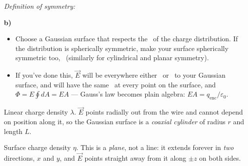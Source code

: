 \documentclass[12pt]{article}
\begin{document}
\textit{Definition of symmetry:}
\par\vspace{3.2cm}

\textbf{b)}
\begin{itemize}[itemsep=9pt,parsep=4pt,topsep=4pt]
\item Choose a Gaussian surface that respects the \bl[4.0cm]\ of the charge
distribution. If the distribution is spherically symmetric, make your surface
spherically symmetric too, \bl[6.4cm]\ (similarly for cylindrical and planar symmetry).
\item If you've done this, $\vec E$ will be everywhere either \bl[4.4cm]\ or
\bl[4.4cm]\ to your Gaussian surface, and will have the same \bl[3.2cm]\ at every
point on the surface, and $\Phi=E\oint dA=EA$ --- Gauss's law becomes
plain algebra: $EA=q_{\text{enc}}/\varepsilon_0$.
\end{itemize}



\vspace*{\fill}
\newpage


Linear charge density $\lambda$. $\vec{E}$ points radially out from the wire and cannot
depend on position along it, so the Gaussian surface is a \emph{coaxial cylinder} of
radius $r$ and length $L$.

\vspace{6.7cm}




Surface charge density $\eta$. This is a \emph{plane}, not a line: it extends forever in
\emph{two} directions, $x$ and $y$, and $\vec{E}$ points straight away from it along $\pm z$
on both sides.
\end{document}
